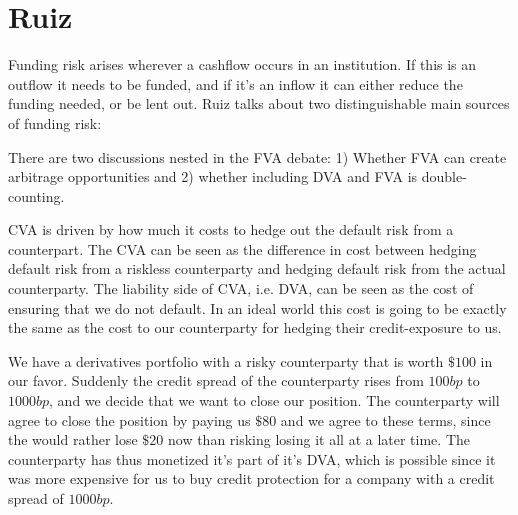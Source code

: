 \documentclass[10pt,a4paper]{article}
\begin{document}
     \section{Ruiz}
        Funding risk arises wherever a cashflow occurs in an institution. If this is an outflow it needs to be funded, and if it's an inflow it can either reduce the funding needed, or be lent out. Ruiz talks about two distinguishable main sources of funding risk:

        There are two discussions nested in the FVA debate: 1) Whether FVA can create arbitrage opportunities and 2) whether including DVA and FVA is double-counting.

        CVA is driven by how much it costs to hedge out the default risk from a counterpart. The CVA can be seen as the difference in cost between hedging default risk from a riskless counterparty and hedging default risk from the actual counterparty. The liability side of CVA, i.e. DVA, can be seen as the cost of ensuring that we do not default. In an ideal world this cost is going to be exactly the same as the cost to our counterparty for hedging their credit-exposure to us. 

        We have a derivatives portfolio with a risky counterparty that is worth $\$100$ in our favor. Suddenly the credit spread of the counterparty rises from $100bp$ to $1000bp$, and we decide that we want to close our position. The counterparty will agree to close the position by paying us $\$80$ and we agree to these terms, since the would rather lose $\$20$ now than risking losing it all at a later time. The counterparty has thus monetized it's part of it's DVA, which is possible since it was more expensive for us to buy credit protection for a company with a credit spread of $1000bp$.
\end{document}

